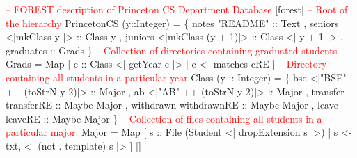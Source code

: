 \begin{code}
\textcolor{red}{-- FOREST description of Princeton CS Department Database}
[forest|
  \textcolor{red}{-- Root of the hierarchy}
   PrincetonCS (y::Integer) = 
    \{ notes  "README" :: Text
    , seniors    <|mkClass y      |> :: Class y
    , juniors    <|mkClass (y + 1)|> :: Class <| y + 1 |>
    , graduates :: Grads
    \}
\mbox{}
  \textcolor{red}{-- Collection of directories containing graduated students}
   Grads = 
     Map [ c :: Class <| getYear c |> | c <- matches cRE ] 
\mbox{}
  \textcolor{red}{-- Directory containing all students in a particular year}
   Class (y :: Integer) = 
    \{ bse  <|"BSE" ++ (toStrN y 2)|> :: Major
    , ab   <|"AB"  ++ (toStrN y 2)|> :: Major   
    , transfer   transferRE  :: Maybe Major 
    , withdrawn  withdrawnRE :: Maybe Major 
    , leave      leaveRE     :: Maybe Major 
    \}
\mbox{}
  \textcolor{red}{-- Collection of files containing all students in a particular major.}
   Major = Map 
    [ s :: File (Student <| dropExtension s |>) 
    | s <-  txt,  <| (not . template) s |>  ]  
|]
\end{code}
\vfill{}